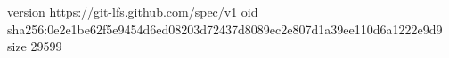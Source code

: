 version https://git-lfs.github.com/spec/v1
oid sha256:0e2e1be62f5e9454d6ed08203d72437d8089ec2e807d1a39ee110d6a1222e9d9
size 29599
